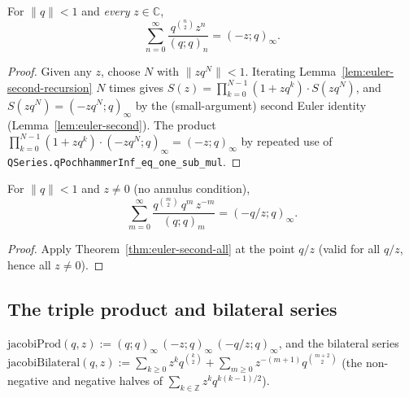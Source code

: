 \begin{theorem}\label{thm:euler-second-all}\leanok{}
For $\|q\| < 1$ and \emph{every} $z\in\mathbb{C}$,
\[
  \sum_{n=0}^{\infty} \frac{q^{\binom{n}{2}} z^n}{(q;q)_n}
    = (-z;q)_\infty.
\]
\end{theorem}

\begin{proof}\leanok{}
Given any $z$, choose $N$ with $\|z q^N\| < 1$. Iterating
Lemma~\ref{lem:euler-second-recursion} $N$ times gives
$S(z) = \prod_{k=0}^{N-1}(1 + z q^k)\cdot S(z q^N)$, and
$S(z q^N) = (-z q^N;q)_\infty$ by the (small-argument) second Euler identity
(Lemma~\ref{lem:euler-second}). The product
$\prod_{k=0}^{N-1}(1 + z q^k)\cdot(-zq^N;q)_\infty = (-z;q)_\infty$ by repeated
use of \texttt{QSeries.qPochhammerInf\_eq\_one\_sub\_mul}.
\end{proof}

\begin{lemma}\label{lem:euler-second-qoz-all}\leanok{}
For $\|q\| < 1$ and $z \neq 0$ (no annulus condition),
\[
  \sum_{m=0}^{\infty} \frac{q^{\binom{m}{2}}\, q^{m}\, z^{-m}}{(q;q)_m}
    = (-q/z;q)_\infty.
\]
\end{lemma}

\begin{proof}\leanok
Apply Theorem~\ref{thm:euler-second-all} at the point $q/z$ (valid for all
$q/z$, hence all $z \neq 0$).
\end{proof}

\subsection{The triple product and bilateral series}

\begin{definition}\label{def:jacobiProd}\leanok{}
$\mathrm{jacobiProd}(q,z) := (q;q)_\infty\,(-z;q)_\infty\,(-q/z;q)_\infty$, and
the bilateral series $\mathrm{jacobiBilateral}(q,z) :=
\sum_{k\ge0} z^k q^{\binom{k}{2}} + \sum_{m\ge0} z^{-(m+1)} q^{\binom{m+2}{2}}$
(the non-negative and negative halves of $\sum_{k\in\mathbb{Z}} z^k q^{k(k-1)/2}$).
\end{definition}

